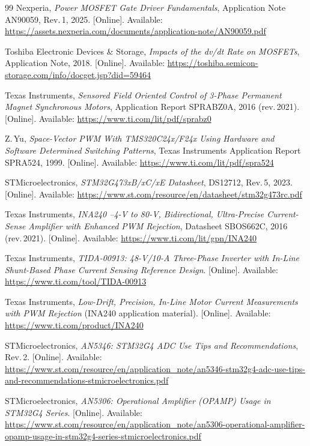 \documentclass[journal,onecolumn,11pt]{IEEEtran}
\begin{document}
\begin{thebibliography}{99}
 Nexperia, \emph{Power MOSFET Gate Driver Fundamentals}, Application Note AN90059, Rev.\,1, 2025. [Online]. Available: \url{https://assets.nexperia.com/documents/application-note/AN90059.pdf}

 Toshiba Electronic Devices \& Storage, \emph{Impacts of the dv/dt Rate on MOSFETs}, Application Note, 2018. [Online]. Available: \url{https://toshiba.semicon-storage.com/info/docget.jsp?did=59464}

 Texas Instruments, \emph{Sensored Field Oriented Control of 3-Phase Permanent Magnet Synchronous Motors}, Application Report SPRABZ0A, 2016 (rev.\,2021). [Online]. Available: \url{https://www.ti.com/lit/pdf/sprabz0}

 Z.\,Yu, \emph{Space-Vector PWM With TMS320C24x/F24x Using Hardware and Software Determined Switching Patterns}, Texas Instruments Application Report SPRA524, 1999. [Online]. Available: \url{https://www.ti.com/lit/pdf/spra524}

 STMicroelectronics, \emph{STM32G473xB/xC/xE Datasheet}, DS12712, Rev.\,5, 2023. [Online]. Available: \url{https://www.st.com/resource/en/datasheet/stm32g473rc.pdf}

 Texas Instruments, \emph{INA240 --4-V to 80-V, Bidirectional, Ultra-Precise Current-Sense Amplifier with Enhanced PWM Rejection}, Datasheet SBOS662C, 2016 (rev.\,2021). [Online]. Available: \url{https://www.ti.com/lit/gpn/INA240}

 Texas Instruments, \emph{TIDA-00913: 48-V/10-A Three-Phase Inverter with In-Line Shunt-Based Phase Current Sensing Reference Design}. [Online]. Available: \url{https://www.ti.com/tool/TIDA-00913}

 Texas Instruments, \emph{Low-Drift, Precision, In-Line Motor Current Measurements with PWM Rejection} (INA240 application material). [Online]. Available: \url{https://www.ti.com/product/INA240}

 STMicroelectronics, \emph{AN5346: STM32G4 ADC Use Tips and Recommendations}, Rev.\,2. [Online]. Available: \url{https://www.st.com/resource/en/application_note/an5346-stm32g4-adc-use-tips-and-recommendations-stmicroelectronics.pdf}

 STMicroelectronics, \emph{AN5306: Operational Amplifier (OPAMP) Usage in STM32G4 Series}. [Online]. Available: \url{https://www.st.com/resource/en/application_note/an5306-operational-amplifier-opamp-usage-in-stm32g4-series-stmicroelectronics.pdf}


\end{thebibliography}
\end{document}
